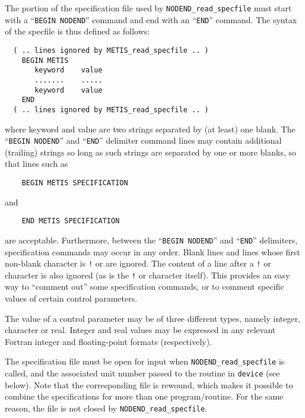 \documentclass{galahad}
\newcommand{\packagename}{NODEND}
\begin{document}
The portion of the specification file used by
{\tt \packagename\_read\_specfile}
must start
with a ``{\tt BEGIN \packagename}'' command and end with an
``{\tt END}'' command.  The syntax of the specfile is thus defined as follows:
\begin{verbatim}
  ( .. lines ignored by METIS_read_specfile .. )
    BEGIN METIS
       keyword    value
       .......    .....
       keyword    value
    END
  ( .. lines ignored by METIS_read_specfile .. )
\end{verbatim}
where keyword and value are two strings separated by (at least) one blank.
The ``{\tt BEGIN \packagename}'' and ``{\tt END}'' delimiter command lines
may contain additional (trailing) strings so long as such strings are
separated by one or more blanks, so that lines such as
\begin{verbatim}
    BEGIN METIS SPECIFICATION
\end{verbatim}
and
\begin{verbatim}
    END METIS SPECIFICATION
\end{verbatim}
are acceptable. Furthermore,
between the
``{\tt BEGIN \packagename}'' and ``{\tt END}'' delimiters,
specification commands may occur in any order.  Blank lines and
lines whose first non-blank character is {\tt !} or {\tt *} are ignored.
The content
of a line after a {\tt !} or {\tt *} character is also
ignored (as is the {\tt !} or {\tt *}
character itself). This provides an easy way to ``comment out'' some
specification commands, or to comment specific values
of certain control parameters.

The value of a control parameter may be of three different types, namely
integer, character or real.
Integer and real values may be expressed in any relevant Fortran integer and
floating-point formats (respectively).

The specification file must be open for
input when {\tt \packagename\_read\_specfile}
is called, and the associated unit number
passed to the routine in {\tt device} (see below).
Note that the corresponding
file is rewound, which makes it possible to combine the specifications
for more than one program/routine.  For the same reason, the file is not
closed by {\tt \packagename\_read\_specfile}.
\end{document}
